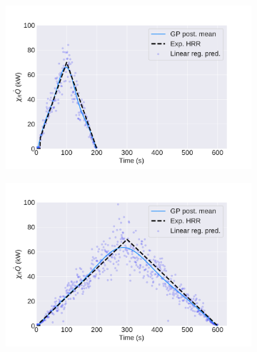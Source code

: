 \documentclass{article}
\begin{document}
\begin{figure}[htbp]
  \centering
  \begin{subfigure}[t]{.45\textwidth}
      \centering
      \includegraphics[width=\textwidth,keepaspectratio]{figures/image_result100s_triangle.pdf}
      \caption{}
      \label{fig:image_result_100s_triangle}
  \end{subfigure}
  \begin{subfigure}[t]{.45\textwidth}
      \centering
      \includegraphics[width=\textwidth ,keepaspectratio]{figures/image_result300s_triangle.pdf}
      \caption{}
      \label{fig:image_result_300s_triangle}
  \end{subfigure}
   \begin{subfigure}[t]{.45\textwidth}
      \centering

\end{subfigure}
\end{figure}
\end{document}
